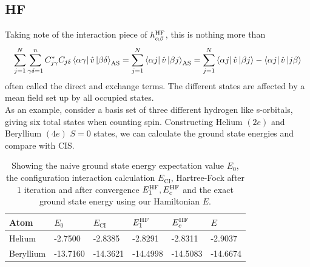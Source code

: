 \documentclass[
11pt,notheorems,hyperref={pdfauthor=whatever}
]{beamer}
\begin{document}
\subsection{HF}
\begin{frame}
    Taking note of the interaction piece of $h^{\text{HF}}_{\alpha\beta}$, this is nothing more than
    \begin{align*}
        \sum_{j=1}^{N} \sum_{\gamma\delta=1}^n C_{j\gamma}^* C_{j\delta} \bra{\alpha\gamma}\hat{v}\ket{\beta\delta}_{\text{AS}} = \sum_{j=1}^N \bra{\alpha j}\hat{v}\ket{\beta j}_{\text{AS}} = \sum_{j=1}^N \bra{\alpha j}\hat{v}\ket{\beta j} - \bra{\alpha j}\hat{v}\ket{j \beta} 
    \end{align*}
    often called the direct and exchange terms. The different states are affected by a mean field set up by all occupied states.
    \\[10pt]
    As an example, consider a basis set of three different hydrogen like s-orbitals, giving six total states when counting spin. Constructing Helium $(2e)$  and Beryllium $(4e)$ $ S= 0$ states, we can calculate the ground state energies and compare with CIS.

    \begin{table}[H]
        \centering
        \begin{tabular}{l|l|l|l|l|l}
        Atom      & $E_0$ & $E_{\text{CI}}$ & $E_1^{\text{HF}}$ & $E_c^{\text{HF}}$ & $E$ \\
        \hline
        Helium    & -2.7500     & -2.8385    & -2.8291 & -2.8311  & -2.9037    \\
        Beryllium & -13.7160     & -14.3621    & -14.4998 & -14.5083  &   -14.6674 
        \end{tabular}
        \caption{Showing the naive ground state energy expectation value $E_0$, the configuration interaction calculation $E_{\text{CI}}$, Hartree-Fock after 1 iteration and after convergence $E_1^{\text{HF}}, E_c^{\text{HF}}$ and the exact ground state energy using our Hamiltonian $E$.}
    \end{table}

\end{frame}
\end{document}
